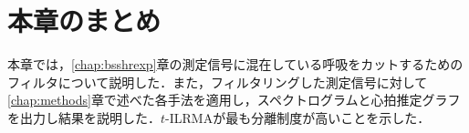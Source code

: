 \section{本章のまとめ}
\label{sec:conv:conclusion5}
本章では，\ref{chap:bsshrexp}章の測定信号に混在している呼吸をカットするためのフィルタについて説明した．また，フィルタリングした測定信号に対して\ref{chap:methods}章で述べた各手法を適用し，スペクトログラムと心拍推定グラフを出力し結果を説明した．$t$-ILRMAが最も分離制度が高いことを示した．